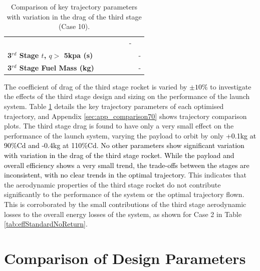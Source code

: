 \begin{table}[ht]
\begin{tabular}{l c c c c c c}
			& \textbf{\thirddExergyEffCdThreeNinetyFiveNoReturn}
			& \textbf{\thirddExergyEffCdThreeStandardNoReturn}
			& \textbf{\thirddExergyEffCdThreeOneOneHundredFiveNoReturn}
			& \textbf{\thirddExergyEffCdThreeOneHundredTenNoReturn}
			& -
			\\
			\textbf{3$^{rd}$ Stage $t$, $q >$ 5kpa (s)}
			& \thirdqOverFiveCdThreeNinetyNoReturn
			& \thirdqOverFiveCdThreeNinetyFiveNoReturn
			& \thirdqOverFiveCdThreeStandardNoReturn
			& \thirdqOverFiveCdThreeOneOneHundredFiveNoReturn
			& \thirdqOverFiveCdThreeOneHundredTenNoReturn
			& -
			\\
			\textbf{3$^{rd}$ Stage Fuel Mass (kg)}
			& \thirdmFuelCdThreeNinetyNoReturn
			& \thirdmFuelCdThreeNinetyFiveNoReturn
			& \thirdmFuelCdThreeStandardNoReturn
			& \thirdmFuelCdThreeOneOneHundredFiveNoReturn
			& \thirdmFuelCdThreeOneHundredTenNoReturn
			& -
			\\
			\hline 
		\end{tabular} 
	\caption{Comparison of key trajectory parameters with variation in the drag of the third stage (Case 10).}
	\label{tab:comparison70}
	
\end{table}
\noindent
The coefficient of drag of the third stage rocket is varied by \textcolor{black}{$\pm10\%$} to investigate the effects of the third stage design and sizing on the performance of the launch system. Table \ref{tab:comparison70} details the key trajectory parameters of each optimised trajectory, and Appendix \ref{sec:app_comparison70} shows trajectory comparison plots. The third stage drag is found to have only a very small effect on the performance of the launch system, varying the payload to orbit by only \textcolor{black}{+0.1kg at 90\%Cd and -0.4kg at 110\%Cd. No other parameters show significant variation with variation in the drag of the third stage rocket. While the payload and overall efficiency shows a very small trend, the trade-offs between the stages are inconsistent, with no clear trends in the optimal trajectory.} This indicates that the aerodynamic properties of the third stage rocket do not contribute significantly to the performance of the system or the optimal trajectory flown. This is corroborated by the small contributions of the third stage aerodynamic losses to the overall energy losses of the system, as shown for Case 2 in Table \ref{tab:effStandardNoReturn}. 



\section{Comparison of Design Parameters}\label{sec:comparisonNoReturn}

